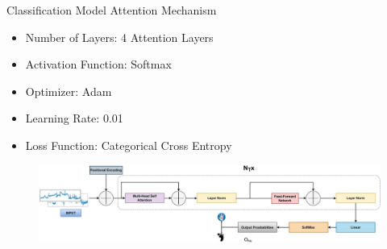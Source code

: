 \begin{frame}{Classification Model \textemdash{} Attention Mechanism}
    \begin{minipage}[c]{.6\textwidth}
        \begin{itemize}
            \item Number of Layers: 4 Attention Layers
            \item Activation Function: Softmax
            \item Optimizer: Adam
            \item Learning Rate: 0.01
            \item Loss Function: Categorical Cross Entropy
        \end{itemize}
    \end{minipage}
    \begin{minipage}[c]{.39\textwidth}
        \begin{figure}[!htbp]
            \centering
            \includegraphics[width=\textwidth]{figures/Methodology/Attention}
        \end{figure}
    \end{minipage}
\end{frame}

